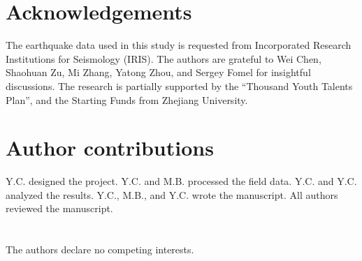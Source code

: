 
%



\section*{Acknowledgements}
The earthquake data used in this study is requested from Incorporated Research Institutions for Seismology (IRIS). The authors are grateful to  Wei Chen, Shaohuan Zu, Mi Zhang, Yatong Zhou, and Sergey Fomel for insightful discussions. The research is partially supported by the “Thousand Youth Talents Plan”, and the Starting Funds from Zhejiang University. 


\section*{Author contributions}
Y.C. designed the project.
Y.C. and M.B. processed the field data. Y.C. and Y.C. analyzed the results.
Y.C., M.B., and Y.C. wrote the manuscript. All authors reviewed the manuscript. 

\section*{}
The authors declare no competing interests.


%

